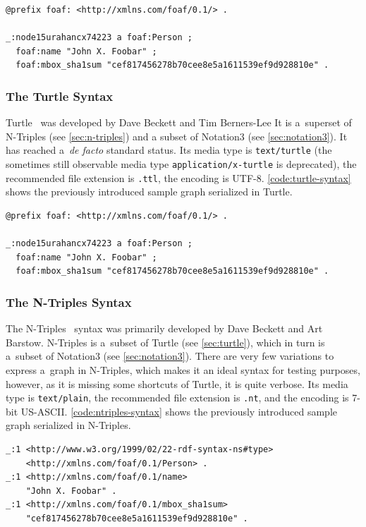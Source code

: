 \begin{lstlisting}[caption={A sample graph in Notation3 syntax.},label={code:notation3-syntax}]
@prefix foaf: <http://xmlns.com/foaf/0.1/> .

_:node15urahancx74223 a foaf:Person ;
  foaf:name "John X. Foobar" ;
  foaf:mbox_sha1sum "cef817456278b70cee8e5a1611539ef9d928810e" .
\end{lstlisting}

\subsubsection{The Turtle Syntax} \label{sec:turtle}
Turtle~\cite{Prudhommeaux2011} was developed by Dave Beckett and Tim Berners-Lee
It is a~superset of N-Triples (see \autoref{sec:n-triples}) and
a subset of Notation3 (see \autoref{sec:notation3}).
It has reached a~\emph{de facto} standard status.
Its media type is \texttt{text/turtle}
(the sometimes still observable media type \texttt{application/x-turtle} is deprecated),
the recommended file extension is \texttt{.ttl}, the encoding is UTF-8.
\autoref{code:turtle-syntax} shows the previously introduced sample graph serialized in Turtle.

\begin{lstlisting}[caption={A sample graph in Turtle syntax.},label={code:turtle-syntax}]
@prefix foaf: <http://xmlns.com/foaf/0.1/> .

_:node15urahancx74223 a foaf:Person ;
  foaf:name "John X. Foobar" ;
  foaf:mbox_sha1sum "cef817456278b70cee8e5a1611539ef9d928810e" .
\end{lstlisting}

\subsubsection{The N-Triples Syntax} \label{sec:n-triples}
The N-Triples~\cite{Grant2004} syntax was primarily developed by Dave Beckett and Art Barstow.
N-Triples is a~subset of Turtle (see \autoref{sec:turtle}),
which in turn is a~subset of Notation3 (see \autoref{sec:notation3}).
There are very few variations to express a~graph in N-Triples,
which makes it an ideal syntax for testing purposes, however,
as it is missing some shortcuts of Turtle, it is quite verbose.
Its media type is \texttt{text/plain}, the recommended file extension is \texttt{.nt},
and the encoding is 7-bit US-ASCII.
\autoref{code:ntriples-syntax} shows the previously introduced sample graph serialized in N-Triples.

\begin{lstlisting}[caption={A sample graph in N-Triples syntax.},label={code:ntriples-syntax}]
_:1 <http://www.w3.org/1999/02/22-rdf-syntax-ns#type>
    <http://xmlns.com/foaf/0.1/Person> .
_:1 <http://xmlns.com/foaf/0.1/name>
    "John X. Foobar" .
_:1 <http://xmlns.com/foaf/0.1/mbox_sha1sum>
    "cef817456278b70cee8e5a1611539ef9d928810e" .
\end{lstlisting}

